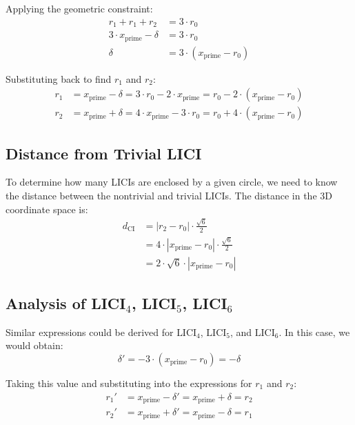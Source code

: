 \documentclass{article}
\begin{document}
Applying the geometric constraint:
\begin{align}
r_1 + r_1 + r_2 &= 3 \cdot r_0 \\
3 \cdot x_{\text{prime}} - \delta &= 3 \cdot r_0 \\
\delta &= 3 \cdot (x_{\text{prime}} - r_0)
\end{align}

Substituting back to find $r_1$ and $r_2$:
\begin{align}
r_1 &= x_{\text{prime}} - \delta = 3 \cdot r_0 - 2 \cdot x_{\text{prime}} = r_0 - 2 \cdot (x_{\text{prime}} - r_0) \\
r_2 &= x_{\text{prime}} + \delta = 4 \cdot x_{\text{prime}} - 3 \cdot r_0 = r_0 + 4 \cdot (x_{\text{prime}} - r_0)
\end{align}

\subsection{Distance from Trivial LICI}

To determine how many LICIs are enclosed by a given circle, we need to know the distance between the nontrivial and trivial LICIs. The distance in the 3D coordinate space is:
\begin{align}
d_{\text{CI}} &= |r_2 - r_0| \cdot \frac{\sqrt{6}}{2} \\
&= 4 \cdot |x_{\text{prime}} - r_0| \cdot \frac{\sqrt{6}}{2} \\
&= 2 \cdot \sqrt{6} \cdot |x_{\text{prime}} - r_0|
\end{align}

\subsection{Analysis of LICI$_4$, LICI$_5$, LICI$_6$}

Similar expressions could be derived for $\text{LICI}_4$, $\text{LICI}_5$, and $\text{LICI}_6$. In this case, we would obtain:
\begin{equation}
\delta' = -3 \cdot (x_{\text{prime}} - r_0) = -\delta
\end{equation}

Taking this value and substituting into the expressions for $r_1$ and $r_2$:
\begin{align}
r_1' &= x_{\text{prime}} - \delta' = x_{\text{prime}} + \delta = r_2 \\
r_2' &= x_{\text{prime}} + \delta' = x_{\text{prime}} - \delta = r_1
\end{align}
\end{document}
